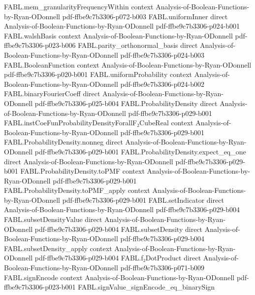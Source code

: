 \begin{theorem}
\proofstep
  {FABL.mem_granularityFrequencyWithin}
  {context}
  {Analysis-of-Boolean-Functions-by-Ryan-ODonnell}
  {pdf-ffbe9c7b3306-p072-b003}
\proofstep
  {FABL.uniformInner}
  {direct}
  {Analysis-of-Boolean-Functions-by-Ryan-ODonnell}
  {pdf-ffbe9c7b3306-p024-b001}
\proofstep
  {FABL.walshBasis}
  {context}
  {Analysis-of-Boolean-Functions-by-Ryan-ODonnell}
  {pdf-ffbe9c7b3306-p023-b006}
\proofstep
  {FABL.parity_orthonormal_basis}
  {direct}
  {Analysis-of-Boolean-Functions-by-Ryan-ODonnell}
  {pdf-ffbe9c7b3306-p024-b003}
\proofstep
  {FABL.BooleanFunction}
  {context}
  {Analysis-of-Boolean-Functions-by-Ryan-ODonnell}
  {pdf-ffbe9c7b3306-p020-b001}
\proofstep
  {FABL.uniformProbability}
  {context}
  {Analysis-of-Boolean-Functions-by-Ryan-ODonnell}
  {pdf-ffbe9c7b3306-p024-b002}
\proofstep
  {FABL.binaryFourierCoeff}
  {direct}
  {Analysis-of-Boolean-Functions-by-Ryan-ODonnell}
  {pdf-ffbe9c7b3306-p025-b004}
\proofstep
  {FABL.ProbabilityDensity}
  {direct}
  {Analysis-of-Boolean-Functions-by-Ryan-ODonnell}
  {pdf-ffbe9c7b3306-p029-b001}
\proofstep
  {FABL.instCoeFunProbabilityDensityForallF₂CubeReal}
  {context}
  {Analysis-of-Boolean-Functions-by-Ryan-ODonnell}
  {pdf-ffbe9c7b3306-p029-b001}
\proofstep
  {FABL.ProbabilityDensity.nonneg}
  {direct}
  {Analysis-of-Boolean-Functions-by-Ryan-ODonnell}
  {pdf-ffbe9c7b3306-p029-b001}
\proofstep
  {FABL.ProbabilityDensity.expect_eq_one}
  {direct}
  {Analysis-of-Boolean-Functions-by-Ryan-ODonnell}
  {pdf-ffbe9c7b3306-p029-b001}
\proofstep
  {FABL.ProbabilityDensity.toPMF}
  {context}
  {Analysis-of-Boolean-Functions-by-Ryan-ODonnell}
  {pdf-ffbe9c7b3306-p029-b001}
\proofstep
  {FABL.ProbabilityDensity.toPMF_apply}
  {context}
  {Analysis-of-Boolean-Functions-by-Ryan-ODonnell}
  {pdf-ffbe9c7b3306-p029-b001}
\proofstep
  {FABL.setIndicator}
  {direct}
  {Analysis-of-Boolean-Functions-by-Ryan-ODonnell}
  {pdf-ffbe9c7b3306-p029-b004}
\proofstep
  {FABL.subsetDensityValue}
  {direct}
  {Analysis-of-Boolean-Functions-by-Ryan-ODonnell}
  {pdf-ffbe9c7b3306-p029-b004}
\proofstep
  {FABL.subsetDensity}
  {direct}
  {Analysis-of-Boolean-Functions-by-Ryan-ODonnell}
  {pdf-ffbe9c7b3306-p029-b004}
\proofstep
  {FABL.subsetDensity_apply}
  {context}
  {Analysis-of-Boolean-Functions-by-Ryan-ODonnell}
  {pdf-ffbe9c7b3306-p029-b004}
\proofstep
  {FABL.f₂DotProduct}
  {direct}
  {Analysis-of-Boolean-Functions-by-Ryan-ODonnell}
  {pdf-ffbe9c7b3306-p071-b009}
\proofstep
  {FABL.signEncode}
  {context}
  {Analysis-of-Boolean-Functions-by-Ryan-ODonnell}
  {pdf-ffbe9c7b3306-p023-b001}
\proofstep
  {FABL.signValue_signEncode_eq_binarySign}

\end{theorem}

